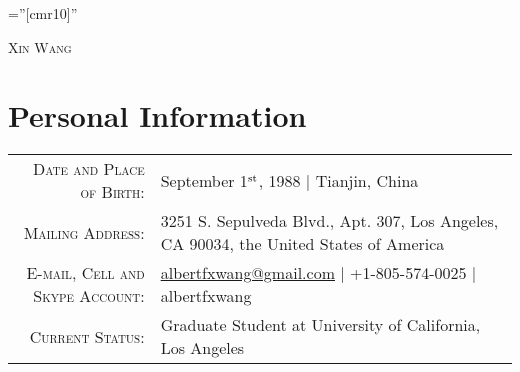 \documentclass[10pt]{article}
\begin{document}
\pagestyle{empty}    %
\font\fb=''[cmr10]'' %

\par{\centering
  {\huge \textsc{Xin Wang}}
\par}
\vspace{-1em}

\section{Personal Information}
\begin{tabular}{rl}
    \textsc{Date and Place of Birth:}       & September 1$^{\rm st}$, 1988  |  Tianjin, China \\
    \textsc{Mailing Address:} & 3251 S. Sepulveda Blvd., Apt. 307, Los Angeles, CA 90034, the United States of America \\
    \textsc{E-mail, Cell and Skype Account:}  & \href{mailto:albertfxwang@gmail.com}{albertfxwang@gmail.com}  |  +1-805-574-0025  |  albertfxwang \\
    \textsc{Current Status:}  & Graduate Student at University of California, Los Angeles \\
\end{tabular}


\end{document}
